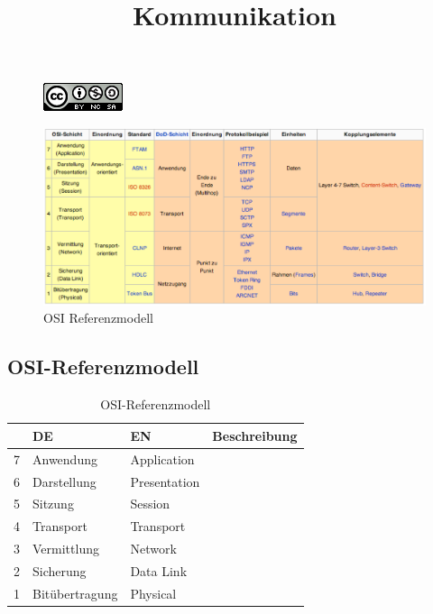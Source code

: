 \documentclass[]{scrartcl}
\begin{document}
\title{Kommunikation}
\author{}


\maketitle
\tableofcontents

\begin{figure}[H]
\begin{center}
\includegraphics[scale=0.6]{figures/88x31.png}
\label{default}
\end{center}
\end{figure}


\begin{figure}[htb]
\begin{center}
\includegraphics[scale=0.6]{figures/osi.pdf}
\caption{OSI Referenzmodell}
\label{osi}
\end{center}
\end{figure}

\subsection{OSI-Referenzmodell}

\begin{table}[H]
\begin{center}
\begin{tabular}{llll}
 & DE & EN & Beschreibung \\
\toprule
7 & Anwendung & Application & \\
\midrule
6 & Darstellung & Presentation & \\
\midrule
5 & Sitzung & Session & \\
\midrule
4 & Transport & Transport & \\
\midrule
3 & Vermittlung & Network & \\
\midrule
2 & Sicherung & Data Link & \\
\midrule
1& Bit\"ubertragung & Physical &  \\
\bottomrule
\end{tabular}
\caption{OSI-Referenzmodell}

\end{center}
\label{default}
\end{table}%
\end{document}
